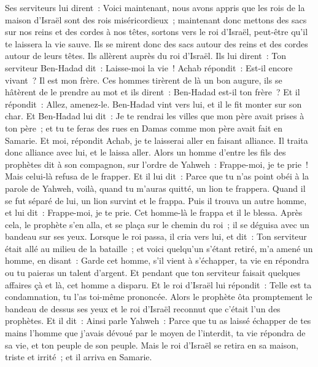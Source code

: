 \begin{multicols}{2}
Ses serviteurs lui dirent~: Voici maintenant, nous avons appris que les rois de la maison d'Israël sont des rois miséricordieux~; maintenant donc mettons des sacs sur nos reins et des cordes à nos têtes, sortons vers le roi d'Israël, peut-être qu'il te laissera la vie sauve.
Ils se mirent donc des sacs autour des reins et des cordes autour de leurs têtes. Ils allèrent auprès du roi d'Israël. Ils lui dirent~: Ton serviteur Ben-Hadad dit~: Laisse-moi la vie~! Achab répondit~: Est-il encore vivant~? Il est mon frère.
Ces hommes tirèrent de là un bon augure, ils se hâtèrent de le prendre au mot et ils dirent~: Ben-Hadad est-il ton frère~? Et il répondit~: Allez, amenez-le. Ben-Hadad vint vers lui, et il le fit monter sur son char.
Et Ben-Hadad lui dit~: Je te rendrai les villes que mon père avait prises à ton père~; et tu te feras des rues en Damas comme mon père avait fait en Samarie. Et moi, répondit Achab, je te laisserai aller en faisant alliance. Il traita donc alliance avec lui, et le laissa aller.
Alors un homme d'entre les fils des prophètes dit à son compagnon, sur l'ordre de Yahweh~: Frappe-moi, je te prie~! Mais celui-là refusa de le frapper.
Et il lui dit~: Parce que tu n'as point obéi à la parole de Yahweh, voilà, quand tu m'auras quitté, un lion te frappera. Quand il se fut séparé de lui, un lion survint et le frappa.
Puis il trouva un autre homme, et lui dit~: Frappe-moi, je te prie. Cet homme-là le frappa et il le blessa.
Après cela, le prophète s'en alla, et se plaça sur le chemin du roi~; il se déguisa avec un bandeau sur ses yeux.
Lorsque le roi passa, il cria vers lui, et dit~: Ton serviteur était allé au milieu de la bataille~; et voici quelqu'un s'étant retiré, m'a amené un homme, en disant~: Garde cet homme, s'il vient à s'échapper, ta vie en répondra ou tu paieras un talent d'argent.
Et pendant que ton serviteur faisait quelques affaires çà et là, cet homme a disparu. Et le roi d'Israël lui répondit~: Telle est ta condamnation, tu l'as toi-même prononcée.
Alors le prophète ôta promptement le bandeau de dessus ses yeux et le roi d'Israël reconnut que c'était l'un des prophètes.
Et il dit~: Ainsi parle Yahweh~: Parce que tu as laissé échapper de tes mains l'homme que j'avais dévoué par le moyen de l'interdit, ta vie répondra de sa vie, et ton peuple de son peuple.
Mais le roi d'Israël se retira en sa maison, triste et irrité~; et il arriva en Samarie.

\end{multicols}
